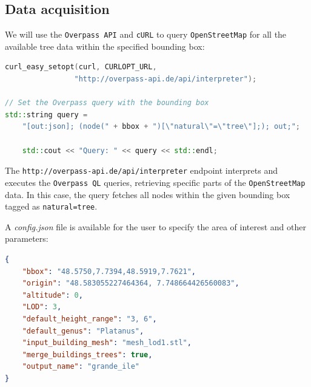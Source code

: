 \documentclass[12pt]{article}
\begin{document}
\subsection{Data acquisition}

We will use the \texttt{Overpass API} and \texttt{cURL} to query
\texttt{OpenStreetMap} for all the available tree data within the specified
bounding box:

\begin{lstlisting}[language=C++]
curl_easy_setopt(curl, CURLOPT_URL,
                "http://overpass-api.de/api/interpreter");

// Set the Overpass query with the bounding box
std::string query =
    "[out:json]; (node(" + bbox + ")[\"natural\"=\"tree\"];); out;";

    std::cout << "Query: " << query << std::endl;
\end{lstlisting}

The \texttt{http://overpass-api.de/api/interpreter} endpoint interprets and
executes the \texttt{Overpass QL}\cite{overpass-ql} queries, retrieving
specific parts of the \texttt{OpenStreetMap} data. In this case, the query
fetches all nodes within the given bounding box tagged as \texttt{natural=tree}.

A \textit{config.json} file is available for the user to specify the area of
interest and other parameters:

\begin{lstlisting}[language=json]
{
    "bbox": "48.5750,7.7394,48.5919,7.7621",
    "origin": "48.583055227464364, 7.748664426560083",
    "altitude": 0,
    "LOD": 3,
    "default_height_range": "3, 6",
    "default_genus": "Platanus",
    "input_building_mesh": "mesh_lod1.stl",
    "merge_buildings_trees": true,
    "output_name": "grande_ile"
}
\end{lstlisting}
\end{document}
